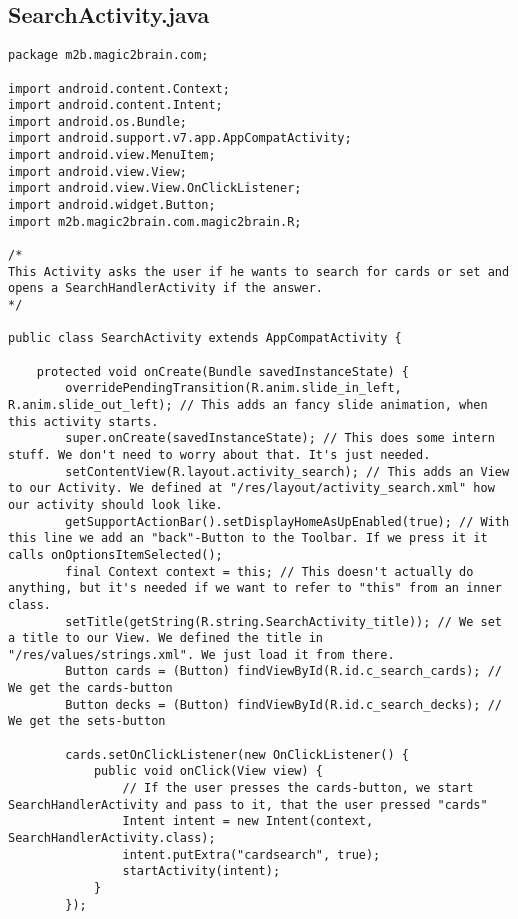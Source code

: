 \subsection{SearchActivity.java}
\begin{lstlisting}
package m2b.magic2brain.com;

import android.content.Context;
import android.content.Intent;
import android.os.Bundle;
import android.support.v7.app.AppCompatActivity;
import android.view.MenuItem;
import android.view.View;
import android.view.View.OnClickListener;
import android.widget.Button;
import m2b.magic2brain.com.magic2brain.R;

/*
This Activity asks the user if he wants to search for cards or set and opens a SearchHandlerActivity if the answer.
*/

public class SearchActivity extends AppCompatActivity {

    protected void onCreate(Bundle savedInstanceState) {
        overridePendingTransition(R.anim.slide_in_left, R.anim.slide_out_left); // This adds an fancy slide animation, when this activity starts.
        super.onCreate(savedInstanceState); // This does some intern stuff. We don't need to worry about that. It's just needed.
        setContentView(R.layout.activity_search); // This adds an View to our Activity. We defined at "/res/layout/activity_search.xml" how our activity should look like.
        getSupportActionBar().setDisplayHomeAsUpEnabled(true); // With this line we add an "back"-Button to the Toolbar. If we press it it calls onOptionsItemSelected();
        final Context context = this; // This doesn't actually do anything, but it's needed if we want to refer to "this" from an inner class.
        setTitle(getString(R.string.SearchActivity_title)); // We set a title to our View. We defined the title in "/res/values/strings.xml". We just load it from there.
        Button cards = (Button) findViewById(R.id.c_search_cards); // We get the cards-button
        Button decks = (Button) findViewById(R.id.c_search_decks); // We get the sets-button

        cards.setOnClickListener(new OnClickListener() {
            public void onClick(View view) {
                // If the user presses the cards-button, we start SearchHandlerActivity and pass to it, that the user pressed "cards"
                Intent intent = new Intent(context, SearchHandlerActivity.class);
                intent.putExtra("cardsearch", true);
                startActivity(intent);
            }
        });


\end{lstlisting}
